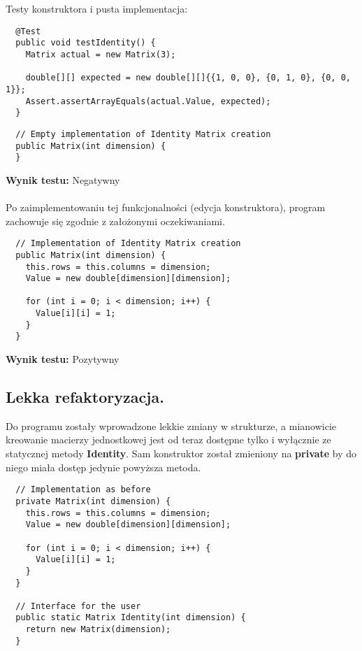 \documentclass[a4paper,12pt,twoside]{article}
\begin{document}
\noindent
Testy konstruktora i pusta implementacja:\\

\begin{lstlisting}
  @Test
  public void testIdentity() {
    Matrix actual = new Matrix(3);

    double[][] expected = new double[][]{{1, 0, 0}, {0, 1, 0}, {0, 0, 1}};
    Assert.assertArrayEquals(actual.Value, expected);
  }
\end{lstlisting}

\begin{lstlisting}
  // Empty implementation of Identity Matrix creation
  public Matrix(int dimension) {
  }
\end{lstlisting}
\medskip

\noindent
\textbf{Wynik testu: }{\color{red} Negatywny}\\\\
Po zaimplementowaniu tej funkcjonalności (edycja konstruktora), program
zachowuje się zgodnie z założonymi oczekiwaniami.\\

\begin{lstlisting}
  // Implementation of Identity Matrix creation
  public Matrix(int dimension) {
    this.rows = this.columns = dimension;
    Value = new double[dimension][dimension];

    for (int i = 0; i < dimension; i++) {
      Value[i][i] = 1;
    }
  }
\end{lstlisting}
\medskip

\noindent
\textbf{Wynik testu: }{\color{green} Pozytywny}


\subsection{Lekka refaktoryzacja.}
\bigskip


Do programu zostały wprowadzone lekkie zmiany w strukturze, a mianowicie kreowanie macierzy
jednostkowej jest od teraz dostępne tylko i wyłącznie ze statycznej metody \textbf{Identity}.
Sam konstruktor został zmieniony na \textbf{private} by do niego miała dostęp jedynie
powyższa metoda.\\

\begin{lstlisting}
  // Implementation as before
  private Matrix(int dimension) {
    this.rows = this.columns = dimension;
    Value = new double[dimension][dimension];

    for (int i = 0; i < dimension; i++) {
      Value[i][i] = 1;
    }
  }

  // Interface for the user
  public static Matrix Identity(int dimension) {
    return new Matrix(dimension);
  }
\end{lstlisting}
\medskip
\end{document}
